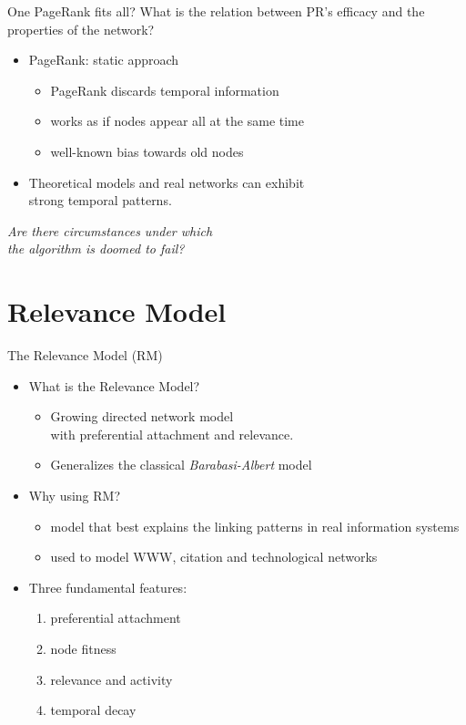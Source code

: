 \documentclass[utf8]{beamer}
\begin{document}
\begin{frame}{One PageRank fits all?}
    What is the relation between PR's efficacy and the properties of the network?
    \begin{itemize}
        \item PageRank: \alert{static} approach
        \begin{itemize}
            \item PageRank discards temporal information
            \item works as if nodes appear all at the same time
            \item well-known bias towards old nodes
        \end{itemize}
        \item Theoretical models and real networks can exhibit \\ \alert{strong temporal patterns}.
    \end{itemize}
    \begin{center}
        \emph{Are there circumstances under which \\ the algorithm is doomed to fail?}
    \end{center}
\end{frame}

\section{Relevance Model}
\begin{frame}{The Relevance Model (RM)}
    \begin{itemize}
        \item What is the Relevance Model?
        \begin{itemize}
            \item Growing directed network model \\ with \alert{preferential attachment} and \alert{relevance}.
            \item Generalizes the classical \emph{Barabasi-Albert} model
        \end{itemize}

        \item Why using RM?
        \begin{itemize}
            \item model that best explains the linking patterns in real information systems
            \item used to model WWW, citation and technological networks
        \end{itemize}

        \item Three fundamental features:
        \begin{enumerate}
            \item preferential attachment
            \item node fitness
            \item relevance and activity
            \item temporal decay
        \end{enumerate}
    \end{itemize}
\end{frame}
\end{document}
